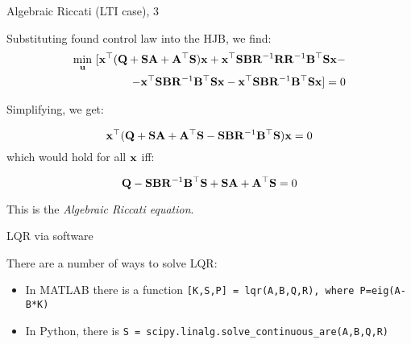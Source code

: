 \documentclass{beamer}
\begin{document}
\begin{frame}{Algebraic Riccati (LTI case), 3}
\begin{flushleft}

Substituting found control law into the HJB, we find:
\begin{equation}
\begin{split}
\underset{\bo{u}}{\min} \ 
[ 
\bo{x}^\top (
\bo{Q} + \bo{S} \bo{A} + \bo{A}^\top \bo{S}
)\bo{x}
+
\bo{x}^\top \bo{S} \bo{B} \bo{R}^{-1} \bo{R} \mathbf  R^{-1} \bo{B}^\top \bo{S} \bo{x}
- \\
- 
\bo{x}^\top \bo{S} \bo{B} \bo{R}^{-1} \bo{B}^\top \bo{S} \bo{x}
- 
\bo{x}^\top\bo{S} \bo{B} \bo{R}^{-1} \bo{B}^\top \bo{S} \bo{x} 
] = 0
\end{split}
\end{equation}

Simplifying, we get: 

\begin{equation}
\mathbf{x}^\top (\mathbf{Q} + \mathbf{S} \mathbf{A} + \mathbf{A}^\top \mathbf{S}
- \mathbf{S} \mathbf{B} \mathbf{R}^{-1} \mathbf{B}^\top \mathbf{S}) \mathbf{x} = 0
\end{equation}
%
which would hold for all $\mathbf{x}$ iff:
%

\begin{equation}
\mathbf{Q} - \mathbf{S} \mathbf{B} \mathbf{R}^{-1} \mathbf{B}^\top \mathbf{S} 
 + \mathbf{S} \mathbf{A} + \mathbf{A}^\top \mathbf{S} = 0
\end{equation}

This is the \emph{Algebraic Riccati equation}.

\end{flushleft}
\end{frame}



\begin{frame}{LQR via software}
\begin{flushleft}

There are a number of ways to solve LQR:

\bigskip

\begin{itemize}
    \item In MATLAB there is a function \texttt{[K,S,P] = lqr(A,B,Q,R), where P=eig(A-B*K)}
    \item In Python, there is \texttt{S = scipy.linalg.solve\_continuous\_are(A,B,Q,R)}
\end{itemize}

\end{flushleft}
\end{frame}
\end{document}
